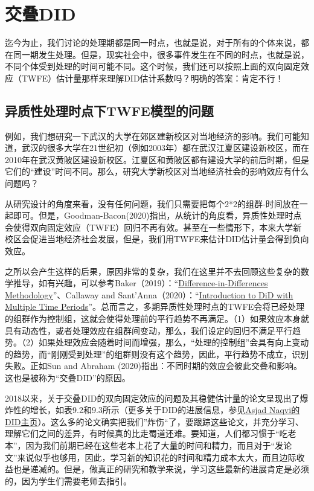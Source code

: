 \documentclass[cn,12pt,math=newtx,citestyle=gb7714-2015,bibstyle=gb7714-2015]{elegantbook}
\begin{document}
	
	
	\section{交叠DID}
	
	迄今为止，我们讨论的处理期都是同一时点，也就是说，对于所有的个体来说，都在同一期发生处理。但是，现实社会中，很多事件发生在不同的时点，也就是说，不同个体受到处理的时间可能不同。这个时候，我们还可以按照上面的双向固定效应（TWFE）估计量那样来理解DID估计系数吗？明确的答案：肯定不行！
	
	\subsection{异质性处理时点下TWFE模型的问题}
	
	例如，我们想研究一下武汉的大学在郊区建新校区对当地经济的影响。我们可能知道，武汉的很多大学在21世纪初（例如2003年）都在武汉江夏区建设新校区，而在2010年在武汉黄陂区建设新校区。江夏区和黄陂区都有建设大学的前后时期，但是它们的“建设”时间不同。那么，研究大学新校区对当地经济社会的影响效应有什么问题吗？
	
	从研究设计的角度来看，没有任何问题，我们只需要把每个2*2的组群-时间放在一起即可。但是，Goodman-Bacon(2020)指出，从统计的角度看，异质性处理时点会使得双向固定效应（TWFE）回归不再有效。甚至在一些情形下，本来大学新校区会促进当地经济社会发展，但是，我们用TWFE来估计DID估计量会得到负向效应。
	
	之所以会产生这样的后果，原因非常的复杂，我们在这里并不去回顾这些复杂的数学推导，如有兴趣，可以参考Baker（2019）：“\href{https://andrewcbaker.netlify.app/2019/09/25/difference-in-differences-methodology/}{Difference-in-Differences Methodology}”、Callaway and Sant’Anna（2020）：“\href{https://cran.r-project.org/web/packages/did/vignettes/multi-period-did.html}{Introduction to DiD with Multiple Time Periods}”。总而言之，多期异质性处理时点的TWFE会将已经处理的组群作为控制组，这就会使得处理前的平行趋势不再满足。（1）如果效应本身就具有动态性，或者处理效应在组群间变动，那么，我们设定的回归不满足平行趋势。（2）如果处理效应会随着时间而增强，那么，“处理的控制组”会具有向上变动的趋势，而“刚刚受到处理”的组群则没有这个趋势，因此，平行趋势不成立，识别失败。正如Sun and Abraham (2020)指出：不同时期的效应会彼此交叠和影响。这也是被称为“交叠DID”的原因。
	
		2018以来，关于交叠DID的双向固定效应的问题及其稳健估计量的论文呈现出了爆炸性的增长，如表9.2和9.3所示（更多关于DID的进展信息，参见\href{https://asjadnaqvi.github.io/DiD/}{Asjad Naqvi的DID主页}）。这么多的论文确实把我们”炸伤“了，要跟踪这些论文，并充分学习、理解它们之间的差异，有时候真的比走蜀道还难。要知道，人们都习惯于“吃老本”，因为我们前期已经在这些老本上花了大量的时间和精力，而且对于“发论文”来说似乎也够用，因此，学习新的知识花的时间和精力成本太大，而且边际收益也是递减的。但是，做真正的研究和教学来说，学习这些最新的进展肯定是必须的，因为学生们需要老师去指引。
	
\end{document}
